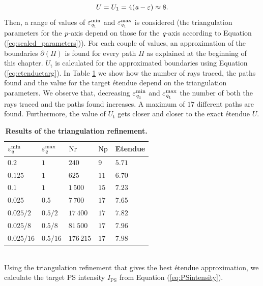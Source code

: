 \begin{equation}
U = U_1 = 4(\textit{a}-\varepsilon)\approx 8.
\end{equation}
Then, a range of values of $\varepsilon_{\textit{q}_1}^{\textrm{min}}$ and $\varepsilon_{\textit{q}_1}^{\textrm{max}}$ is considered (the triangulation parameters for the $\textit{p}$-axis depend on those for the $\textit{q}$-axis according to Equation (\ref{eq:scaled_parameters})). For each couple of values, an approximation of the boundaries $\partial$$(\Pi)$ is found for every path $\Pi$ as explained at the beginning of this chapter. $U_{\textrm{t}}$ is calculated for the approximated boundaries using Equation (\ref{eq:etenduetarg}). In Table \ref{tab:etendue_pr} we show how the number of rays traced, the paths found and the value for the target \'{e}tendue depend on the triangulation parameters.
We observe that, decreasing $\varepsilon_{\textit{q}_1}^{\textrm{min}}$ and $\varepsilon_{\textit{q}_1}^{\textrm{max}}$ the number of both the rays traced and the paths found increases. A maximum of $17$ different paths are found. Furthermore, the value of $U_{\textrm{t}}$ gets closer and closer to the exact \'{e}tendue $U$.
\begin{table}[ht] 
\centering
\caption{\bf Results of the triangulation refinement.}
\begin{tabular}{lllll}
 \hline   $\varepsilon_{\textit{q}}^{\textrm{min}} $  & $\varepsilon_{\textit{q}}^{\textrm{max}}$ & $\textrm{Nr}$ & $\textrm{Np}$ & Etendue \\
  \hline 
 $0.2$ & $1$   & $240$   &  $9$ & $5.71$\\
$0.125$  & $1$    & $625$    & $11$ & $6.70$ \\
$0.1$ & $1$   & $1\,500$   &  $15$ & $7.23$\\
$0.025$  & $0.5$    & $7\,700$  & $17$ & $7.65$\\
 $0.025/2$  & $0.5/2$  & $17\,400$   & $17$ & $7.82$\\
 $0.025/8$ & $0.5/8$  & $81\,500$    & $17$ & $7.96$\\
$0.025/16$ & $0.5/16$  & $176\,215$    & $17$ & $7.98$\\
 \hline
 \end{tabular}
 \label{tab:etendue_pr}
 \end{table}
\\ \indent Using the triangulation refinement that gives the best \'{e}tendue approximation, we calculate the target PS intensity $\hat{I}_{\textrm{PS}}$ from Equation (\ref{eq:PSintensity}).
